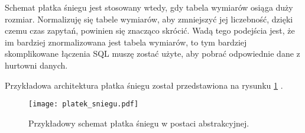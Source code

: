 Schemat płatka śniegu jest stosowany wtedy, gdy tabela wymiarów osiąga duży rozmiar.
Normalizuję się tabele wymiarów, aby zmniejszyć jej liczebność, dzięki czemu czas zapytań, 
powinien się znacząco skrócić. 
Wadą tego podejścia jest, że im bardziej znormalizowana jest tabela wymiarów,  
to tym bardziej skomplikowane łączenia SQL muszę zostać użyte, aby pobrać odpowiednie
dane z hurtowni danych. \cite{TodMan} \cite{cube}

Przykładowa architektura płatka śniegu został przedstawiona na rysunku \ref{fig:platek_sniegu} .

\begin{center}
\begin{figure}[H]
  \begin{center}
    \texttt{[image: platek\_sniegu.pdf]}
  \end{center}
  \caption{Przykładowy schemat płatka śniegu w postaci abstrakcyjnej. }
    \label{fig:platek_sniegu}
\end{figure}
\end{center}







\begin{comment}
 
\end{comment}
